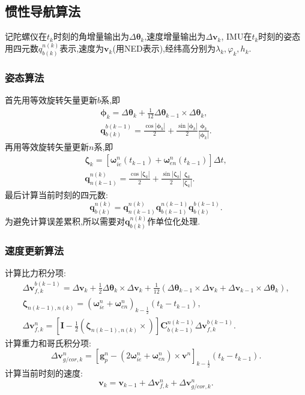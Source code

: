 \documentclass[10pt,a4paper]{ctexart}
\begin{document}
\subsection{惯性导航算法}\label{sec:INS}

记陀螺仪在$t_k$时刻的角增量输出为$\Delta\boldsymbol{\theta}_k$,速度增量输出为$\Delta\boldsymbol{v}_k$, IMU在$t_k$时刻的姿态用四元数$q_{b(k)}^{n(k)}$表示,速度为$\boldsymbol{v}_k$(用NED表示),经纬高分别为$\lambda_k,\varphi_k,h_k$.
\subsubsection*{姿态算法}
首先用等效旋转矢量更新$b$系,即
\begin{gather*}
    \boldsymbol{\phi}_k =\Delta\boldsymbol{\theta}_k + \frac{1}{12}\Delta\boldsymbol{ \theta }_{k - 1} \times \Delta\boldsymbol{\theta}_k,\\
    \boldsymbol{q}_{b(k)}^{b(k - 1)} =\frac{\cos |\boldsymbol{\phi}_k|}{2} + \frac{ \sin | \boldsymbol{\phi}_k |}{2} \frac{\boldsymbol{\phi}_k}{| \boldsymbol{\phi}_k |}.
\end{gather*}
再用等效旋转矢量更新$n$系,即
\begin{gather*}
    \boldsymbol{\zeta}_k =[\boldsymbol{\omega}_{ie}^n(t_{k - 1}) +\boldsymbol{\omega}_{en}^n(t_{k - 1})]\Delta t,\\
    \boldsymbol{q}_{n(k - 1)}^{n(k)} =\frac{\cos |\boldsymbol{\zeta}_k|}{2} + \frac{ \sin | \boldsymbol{\zeta}_k |}{2} \frac{\boldsymbol{\zeta}_k}{| \boldsymbol{\zeta}_k |}.
\end{gather*}
最后计算当前时刻的四元数:
\[
    \boldsymbol{q}_{b(k)}^{n(k)} = \boldsymbol{q}_{n(k - 1)}^{n(k)}\boldsymbol{q}_{b(k - 1)}^{n(k - 1)}\boldsymbol{q}_{b(k)}^{b(k - 1)}.
\]
为避免计算误差累积,所以需要对$\boldsymbol{q}_{b(k)}^{n(k)}$作单位化处理.

\subsubsection*{速度更新算法}

计算比力积分项:
\begin{gather*}
    \Delta\boldsymbol{v}_{f,k}^{b(k - 1)} =\Delta\boldsymbol{v}_k + \frac{1}{2}\Delta\boldsymbol{\theta}_k\times\Delta\boldsymbol{v}_k + \frac{1}{12}(\Delta\boldsymbol{\theta}_{k - 1}\times\Delta\boldsymbol{v}_k +\Delta\boldsymbol{v}_{k - 1}\times\Delta\boldsymbol{\theta}_{k}),\\
    \boldsymbol{\zeta}_{n(k - 1),n(k)} =(\boldsymbol{\omega}_{ie}^n +\boldsymbol{\omega}_{en}^n)_{k - \frac{1}{2}}(t_k - t_{k - 1}),\\
    \Delta\boldsymbol{v}_{f,k}^n = \left[\mathbf{I} - \frac{1}{2}(\boldsymbol{\zeta}_{n(k - 1),n(k)}\times)\right]\mathbf{C}_{b(k - 1)}^{n(k - 1)}\Delta\boldsymbol{v}_{f,k}^{b(k - 1)}.
\end{gather*}
计算重力和哥氏积分项:
\[
    \Delta\boldsymbol{v}_{g /cor,k}^n =[\boldsymbol{g}_p^n -(2\boldsymbol{\omega}_{ie}^n +\boldsymbol{\omega}_{en}^n)\times\boldsymbol{v}^n]_{k - \frac{1}{2}}(t_k - t_{k - 1}).
\]
计算当前时刻的速度:
\[
    \boldsymbol{v}_k =\boldsymbol{v}_{k - 1} +\Delta\boldsymbol{v}_{f,k}^n +\Delta\boldsymbol{v}_{g /cor,k}^n.
\]
\end{document}

